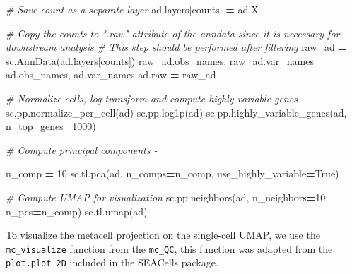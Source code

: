 \documentclass[
]{book}
\newenvironment{Shaded}{\begin{snugshade}}{\end{snugshade}}
\newcommand{\CommentTok}[1]{\textcolor[rgb]{0.56,0.35,0.01}{\textit{#1}}}
\newcommand{\DecValTok}[1]{\textcolor[rgb]{0.00,0.00,0.81}{#1}}
\newcommand{\NormalTok}[1]{#1}
\newcommand{\OperatorTok}[1]{\textcolor[rgb]{0.81,0.36,0.00}{\textbf{#1}}}
\newcommand{\StringTok}[1]{\textcolor[rgb]{0.31,0.60,0.02}{#1}}
\newcommand{\VariableTok}[1]{\textcolor[rgb]{0.00,0.00,0.00}{#1}}
\begin{document}
\begin{Shaded}
\begin{Highlighting}[]
\CommentTok{\# Save count as a separate layer}
\NormalTok{ad.layers[}\StringTok{\textquotesingle{}counts\textquotesingle{}}\NormalTok{] }\OperatorTok{=}\NormalTok{ ad.X}

\CommentTok{\# Copy the counts to ".raw" attribute of the anndata since it is necessary for downstream analysis}
\CommentTok{\# This step should be performed after filtering }
\NormalTok{raw\_ad }\OperatorTok{=}\NormalTok{ sc.AnnData(ad.layers[}\StringTok{\textquotesingle{}counts\textquotesingle{}}\NormalTok{])}
\NormalTok{raw\_ad.obs\_names, raw\_ad.var\_names }\OperatorTok{=}\NormalTok{ ad.obs\_names, ad.var\_names}
\NormalTok{ad.raw }\OperatorTok{=}\NormalTok{ raw\_ad}


\CommentTok{\# Normalize cells, log transform and compute highly variable genes}
\NormalTok{sc.pp.normalize\_per\_cell(ad)}
\NormalTok{sc.pp.log1p(ad)}
\NormalTok{sc.pp.highly\_variable\_genes(ad, n\_top\_genes}\OperatorTok{=}\DecValTok{1000}\NormalTok{)}

\CommentTok{\# Compute principal components {-} }

\NormalTok{n\_comp    }\OperatorTok{=} \DecValTok{10}
\NormalTok{sc.tl.pca(ad, n\_comps}\OperatorTok{=}\NormalTok{n\_comp, use\_highly\_variable}\OperatorTok{=}\VariableTok{True}\NormalTok{)}


\CommentTok{\# Compute UMAP for visualization }
\NormalTok{sc.pp.neighbors(ad, n\_neighbors}\OperatorTok{=}\DecValTok{10}\NormalTok{, n\_pcs}\OperatorTok{=}\NormalTok{n\_comp)}
\NormalTok{sc.tl.umap(ad)}
\end{Highlighting}
\end{Shaded}

To visualize the metacell projection on the single-cell UMAP, we use the \texttt{mc\_visualize} function from the \texttt{mc\_QC}, this function was adapted from the \texttt{plot.plot\_2D} included in the SEACells package.
\end{document}
